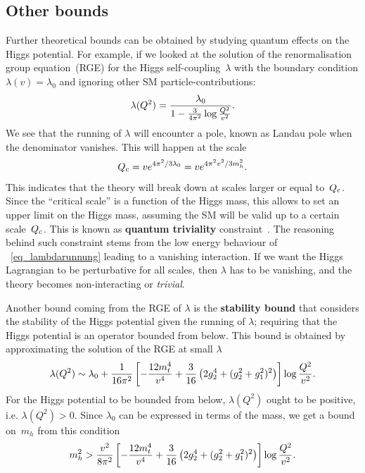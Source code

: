 \subsection{Other bounds}
\par Further theoretical bounds can be obtained by studying quantum effects on the Higgs potential. For example, if we looked at the solution of the renormalisation group equation~(RGE) for the Higgs self-coupling~$\lambda$ with the boundary condition $ \lambda(v)=\lambda_0$ and ignoring other SM particle-contributions:
\begin{equation}
	\lambda (Q^2) = \frac{\lambda_0}{1-\frac{3}{4 \pi^2} \log {Q^2\over v^2}}.
	\label{eq_lambdarunnung}
\end{equation}
We see that the running of $\lambda$ will encounter a pole, known as {Landau pole} when the denominator vanishes. This will happen at the scale
\begin{equation}
	Q_{{\rm c}} = v e^{4 \pi^2/3 \lambda_0} =  v e^{4 \pi^2 v^2/3 m_h^2}.
\end{equation}
This indicates that the theory will break down at scales larger or equal to~$ Q_{{\rm c}} $. Since the ``critical scale'' is a function of the Higgs mass, this allows to set an upper limit on the Higgs mass, assuming the SM will be valid up to a certain scale~$ Q_{{\rm c}} $. This is known as \textbf{quantum triviality } constraint~\cite{Lindner:1985uk}. The reasoning behind such constraint stems from the low energy behaviour of ~\eqref{eq_lambdarunnung} leading to a vanishing interaction. If we want the Higgs Lagrangian to be perturbative for all scales, then $\lambda$ has to be vanishing, and the theory becomes non-interacting or \emph{trivial}. 
\par Another bound coming from the RGE of $\lambda$ is the \textbf{stability bound} that considers the stability of the Higgs potential given the running of $\lambda$;  requiring that the Higgs potential is an operator bounded from below. This bound is obtained by approximating the solution of the RGE at small $\lambda$ 
\begin{equation}
	\lambda(Q^2)\sim \lambda_0 +\frac{1}{16 \pi^2} \left[ - \frac{12m_t^4}{v^4} + \frac{3}{16} \left( 2g_2^4+(g_2^2+g_1^2)^2\right) \right] \log{Q^2\over v^2}.
\end{equation}
For the Higgs potential to be bounded from below, $\lambda(Q^2)$ ought to be positive, i.e. $\lambda(Q^2) > 0$. Since $\lambda_0$ can be expressed in terms of the mass, we get a bound on~$m_h$ from this condition
\begin{equation}
	m_h^2 > \frac{v^2}{8 \pi^2} \left[ - \frac{12m_t^4}{v^4} + \frac{3}{16} \left( 2g_2^4+(g_2^2+g_1^2)^2\right) \right] \log{Q^2\over v^2}.
\end{equation}
